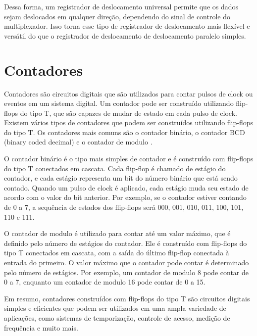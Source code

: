 Dessa forma, um registrador de deslocamento universal permite que os dados sejam deslocados em qualquer direção, dependendo do sinal de controle do multiplexador. Isso torna esse tipo de registrador de deslocamento mais flexível e versátil do que o registrador de deslocamento de deslocamento paralelo simples. 

\section{Contadores}
Contadores são circuitos digitais que são utilizados para contar pulsos de clock ou eventos em um sistema digital. Um contador pode ser construído utilizando flip-flops do tipo T, que são capazes de mudar de estado em cada pulso de clock. Existem vários tipos de contadores que podem ser construídos utilizando flip-flops do tipo T. Os contadores mais comuns são o contador binário, o contador BCD (binary coded decimal) e o contador de modulo \cite{floyd}.

O contador binário é o tipo mais simples de contador e é construído com flip-flops do tipo T conectados em cascata. Cada flip-flop é chamado de estágio do contador, e cada estágio representa um bit do número binário que está sendo contado. Quando um pulso de clock é aplicado, cada estágio muda seu estado de acordo com o valor do bit anterior. Por exemplo, se o contador estiver contando de 0 a 7, a sequência de estados dos flip-flops será 000, 001, 010, 011, 100, 101, 110 e 111.

O contador de modulo é utilizado para contar até um valor máximo, que é definido pelo número de estágios do contador. Ele é construído com flip-flops do tipo T conectados em cascata, com a saída do último flip-flop conectada à entrada do primeiro. O valor máximo que o contador pode contar é determinado pelo número de estágios. Por exemplo, um contador de modulo 8 pode contar de 0 a 7, enquanto um contador de modulo 16 pode contar de 0 a 15.

Em resumo, contadores construídos com flip-flops do tipo T são circuitos digitais simples e eficientes que podem ser utilizados em uma ampla variedade de aplicações, como sistemas de temporização, controle de acesso, medição de frequência e muito mais.